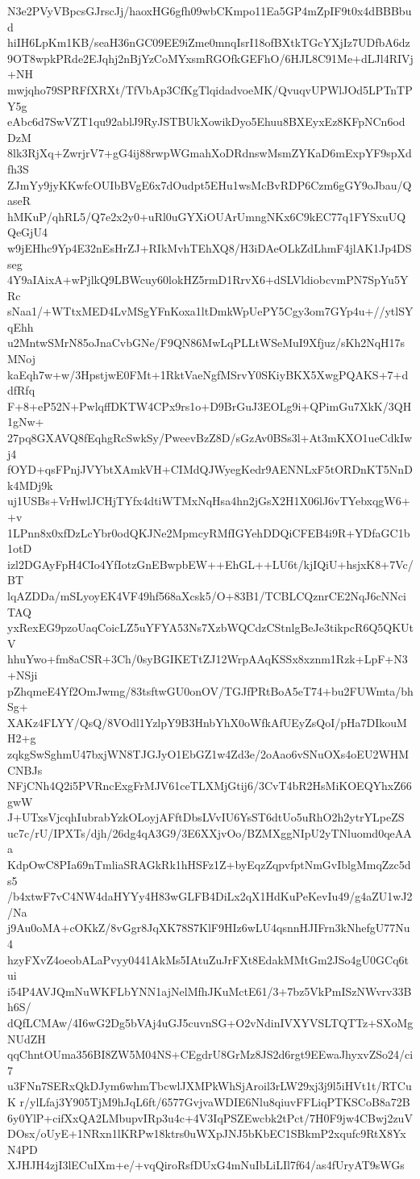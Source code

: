 N3e2PVyVBpcsGJrscJj/haoxHG6gfh09wbCKmpo11Ea5GP4mZpIF9t0x4dBBBbud
hiIH6LpKm1KB/seaH36nGC09EE9iZme0mnqIsrI18ofBXtkTGcYXjIz7UDfbA6dz
9OT8wpkPRde2EJqhj2nBjYzCoMYxsmRGOfkGEFhO/6HJL8C91Me+dLJl4RIVj+NH
mwjqho79SPRFfXRXt/TfVbAp3CfKgTlqidadvoeMK/QvuqvUPWlJOd5LPTnTPY5g
eAbc6d7SwVZT1qu92ablJ9RyJSTBUkXowikDyo5Ehuu8BXEyxEz8KFpNCn6odDzM
8lk3RjXq+ZwrjrV7+gG4ij88rwpWGmahXoDRdnswMsmZYKaD6mExpYF9spXdfh3S
ZJmYy9jyKKwfcOUIbBVgE6x7dOudpt5EHu1wsMcBvRDP6Czm6gGY9oJbau/QaseR
hMKuP/qhRL5/Q7e2x2y0+uRl0uGYXiOUArUmngNKx6C9kEC77q1FYSxuUQQeGjU4
w9jEHhc9Yp4E32nEsHrZJ+RIkMvhTEhXQ8/H3iDAeOLkZdLhmF4jlAK1Jp4DSseg
4Y9aIAixA+wPjlkQ9LBWcuy60lokHZ5rmD1RrvX6+dSLVldiobcvmPN7SpYu5YRc
sNaa1/+WTtxMED4LvMSgYFnKoxa1ltDmkWpUePY5Cgy3om7GYp4u+//ytlSYqEhh
u2MntwSMrN85oJnaCvbGNe/F9QN86MwLqPLLtWSeMuI9Xfjuz/sKh2NqH17sMNoj
kaEqh7w+w/3HpstjwE0FMt+1RktVaeNgfMSrvY0SKiyBKX5XwgPQAKS+7+ddfRfq
F+8+eP52N+PwlqffDKTW4CPx9rs1o+D9BrGuJ3EOLg9i+QPimGu7XkK/3QH1gNw+
27pq8GXAVQ8fEqhgRcSwkSy/PweevBzZ8D/sGzAv0BSs3l+At3mKXO1ueCdkIwj4
fOYD+qsFPnjJVYbtXAmkVH+CIMdQJWyegKedr9AENNLxF5tORDnKT5NnDk4MDj9k
uj1USBs+VrHwlJCHjTYfx4dtiWTMxNqHsa4hn2jGsX2H1X06lJ6vTYebxqgW6++v
1LPnn8x0xfDzLcYbr0odQKJNe2MpmcyRMfIGYehDDQiCFEB4i9R+YDfaGC1b1otD
izl2DGAyFpH4CIo4YfIotzGnEBwpbEW++EhGL++LU6t/kjIQiU+hsjxK8+7Vc/BT
lqAZDDa/mSLyoyEK4VF49hf568aXcsk5/O+83B1/TCBLCQznrCE2NqJ6cNNciTAQ
yxRexEG9pzoUaqCoicLZ5uYFYA53Ns7XzbWQCdzCStnlgBeJe3tikpcR6Q5QKUtV
hhuYwo+fm8aCSR+3Ch/0syBGIKETtZJ12WrpAAqKSSx8xznm1Rzk+LpF+N3+NSji
pZhqmeE4Yf2OmJwmg/83tsftwGU0onOV/TGJfPRtBoA5eT74+bu2FUWmta/bhSg+
XAKz4FLYY/QsQ/8VOdl1YzlpY9B3HnbYhX0oWfkAfUEyZsQoI/pHa7DIkouMH2+g
zqkgSwSghmU47bxjWN8TJGJyO1EbGZ1w4Zd3e/2oAao6vSNuOXs4oEU2WHMCNBJs
NFjCNh4Q2i5PVRncExgFrMJV61ceTLXMjGtij6/3CvT4bR2HsMiKOEQYhxZ66gwW
J+UTxsVjcqhIubrabYzkOLoyjAFftDbsLVvIU6YsST6dtUo5uRhO2h2ytrYLpeZS
uc7c/rU/IPXTs/djh/26dg4qA3G9/3E6XXjvOo/BZMXggNIpU2yTNluomd0qeAAa
KdpOwC8PIa69nTmliaSRAGkRk1hHSFz1Z+byEqzZqpvfptNmGvIblgMmqZzc5ds5
/b4xtwF7vC4NW4daHYYy4H83wGLFB4DiLx2qX1HdKuPeKevIu49/g4aZU1wJ2/Na
j9Au0oMA+cOKkZ/8vGgr8JqXK78S7KlF9HIz6wLU4qsnnHJIFrn3kNhefgU77Nu4
hzyFXvZ4oeobALaPvyy0441AkMs5IAtuZuJrFXt8EdakMMtGm2JSo4gU0GCq6tui
i54P4AVJQmNuWKFLbYNN1ajNelMfhJKuMctE61/3+7bz5VkPmISzNWvrv33Bh6S/
dQfLCMAw/4I6wG2Dg5bVAj4uGJ5cuvnSG+O2vNdinIVXYVSLTQTTz+SXoMgNUdZH
qqChntOUma356BI8ZW5M04NS+CEgdrU8GrMz8JS2d6rgt9EEwaJhyxvZSo24/ci7
u3FNn7SERxQkDJym6whmTbcwlJXMPkWhSjAroil3rLW29xj3j9l5iHVt1t/RTCuK
r/ylLfaj3Y905TjM9hJqL6ft/6577GvjvaWDIE6Nlu8qiuvFFLiqPTKSCoB8a72B
6y0YlP+cifXxQA2LMbupvIRp3u4c+4V3IqPSZEwcbk2tPct/7H0F9jw4CBwj2zuV
DOsx/oUyE+1NRxn1lKRPw18ktrs0uWXpJNJ5bKbEC1SBkmP2xqufc9RtX8YxN4PD
XJHJH4zjI3lECuIXm+e/+vqQiroRsfDUxG4mNuIbLiLIl7f64/as4fUryAT9sWGs
